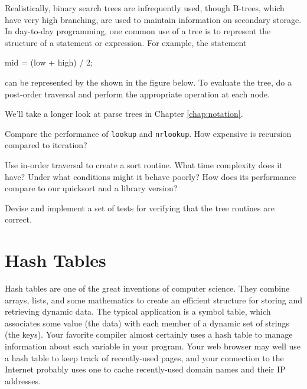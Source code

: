 Realistically, binary search trees are infrequently used, though B-trees,
which have very high branching, are used to maintain information on
secondary storage. In day-to-day programming, one common use of a tree is
to represent the structure of a statement or expression. For example, the
statement
\begin{wellcode}
    mid = (low + high) / 2;
\end{wellcode}
can be represented by the  shown in the figure
below. To evaluate the tree, do a post-order traversal and perform the
appropriate operation at each node.
\begin{center}
\end{center}
We'll take a longer look at parse trees in Chapter \ref{chap:notation}.

\begin{exercise}
Compare the performance of \verb'lookup' and \verb'nrlookup'. How expensive
is recursion compared to iteration?
\end{exercise}

\begin{exercise}
Use in-order traversal to create a sort routine. What time complexity does
it have? Under what conditions might it behave poorly? How does its
performance compare to our quicksort and a library version?
\end{exercise}

\begin{exercise}
Devise and implement a set of tests for verifying that the tree routines
are correct.
\end{exercise}

\section{Hash Tables}
\label{sec:hash_tables}

Hash tables are one of the great inventions of computer science. They
combine arrays, lists, and some mathematics to create an efficient
structure for storing and retrieving dynamic data. The typical application
is a symbol table, which associates some value (the data) with each member
of a dynamic set of strings (the keys). Your favorite compiler almost
certainly uses a hash table to manage information about each variable in
your program. Your web browser may well use a hash table to keep track of
recently-used pages, and your connection to the Internet probably uses one
to cache recently-used domain names and their IP addresses.

